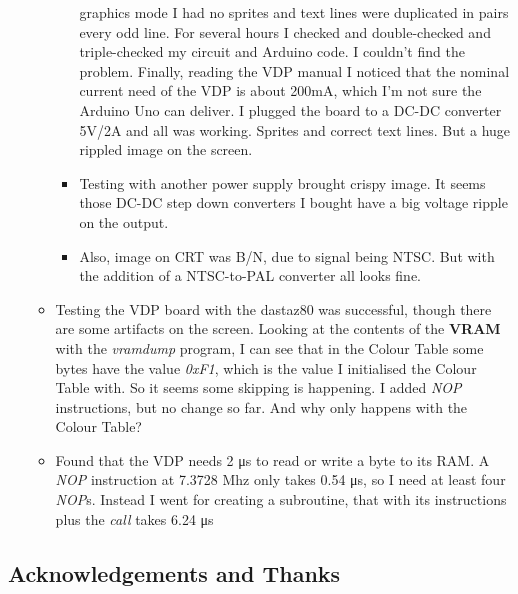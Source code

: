 \documentclass[a4paper,11pt]{article}
\begin{document}
\begin{itemize}
\begin{itemize}
\begin{itemize}
                graphics mode I had no sprites and text lines were duplicated in
                pairs every odd line. For several hours I checked and
                double-checked and triple-checked my circuit and Arduino code.
                I couldn't find the problem. Finally, reading the VDP manual I
                noticed that the nominal current need of the VDP is about 200mA,
                which I'm not sure the Arduino Uno can deliver. I plugged the
                board to a DC-DC converter 5V/2A and all was working. Sprites
                and correct text lines. But a huge rippled image on the screen.
                \item Testing with another power supply brought crispy image.
                It seems those DC-DC step down converters I bought have a big
                voltage ripple on the output.
                \item Also, image on CRT was B/N, due to signal being NTSC. But
                with the addition of a  NTSC-to-PAL converter all looks fine.
            \end{itemize}
            \item Testing the VDP board with the dastaz80 was successful, though
            there are some artifacts on the screen. Looking at the contents of
            the \textbf{VRAM} with the \textit{vramdump} program, I can see that
            in the Colour Table some bytes have the value \textit{0xF1}, which
            is the value I initialised the Colour Table with. So it seems some
            skipping is happening. I added \textit{NOP} instructions, but no
            change so far. And why only happens with the Colour Table?
            \item Found that the VDP needs 2 \si{\micro\second} to read or write
            a byte to its RAM. A \textit{NOP} instruction at 7.3728 Mhz only
            takes 0.54 \si{\micro\second}, so I need at least four \textit{NOP}s.
            Instead I went for creating a subroutine, that with its instructions
            plus the \textit{call} takes 6.24 \si{\micro\second}
        \end{itemize}
    \end{itemize}

    \subsection{Acknowledgements and Thanks}
\end{document}
